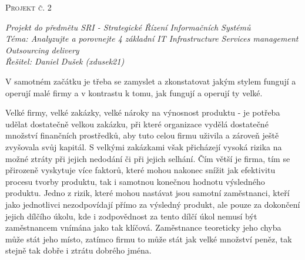 \documentclass[a4paper,12pt]{article}
\renewcommand{\baselinestretch}{1.2}
\begin{document}
	

	\setlength{\parindent}{0pt}
	\vspace*{10pt}
	\LARGE \textsc{Projekt č. 2}
	\normalsize

	\vspace*{5pt}
	\textit{Projekt do předmětu SRI - Strategické Řízení Informačních Systémů} \\
	\textit{Téma: Analyzujte a porovnejte 4 základní IT Infrastructure Services management Outsourcing delivery} \\
	\textit{Řešitel: Daniel Dušek (xdusek21)}

	\setlength{\parindent}{15pt}
	\setlength{\parskip}{15pt}
	\renewcommand{\baselinestretch}{1.5}
	\vspace*{15pt}

    V samotném začátku je třeba se zamyslet a zkonstatovat jakým stylem fungují a operují malé firmy a v kontrastu k tomu, jak fungují a operují ty velké. 
    
    Velké firmy, velké zakázky, velké nároky na výnosnost produktu - je potřeba udělat dostatečně velkou zakázku, při které organizace vydělá dostatečné množství finančních prostředků, aby tuto celou firmu uživila a zároveň ještě zvyšovala svůj kapitál. S velkými zakázkami však přicházejí vysoká rizika na možné ztráty při jejich nedodání či při jejich selhání. Čím větší je firma, tím se přirozeně vyskytuje více faktorů, které mohou nakonec snížit jak efektivitu procesu tvorby produktu, tak i samotnou konečnou hodnotu výsledného produktu. Jedno z rizik, které mohou nastávat jsou samotní zaměstnanci, kteří jako jednotlivci nezodpovídají přímo za výsledný produkt, ale pouze za dokončení jejich dílčího úkolu, kde i zodpovědnost za tento dílčí úkol nemusí být zaměstnancem vnímána jako tak klíčová. Zaměstnance teoreticky jeho chyba může stát  jeho místo, zatímco firmu to může stát jak velké množství peněz, tak stejně tak dobře i ztrátu dobrého jména. 
\end{document}
